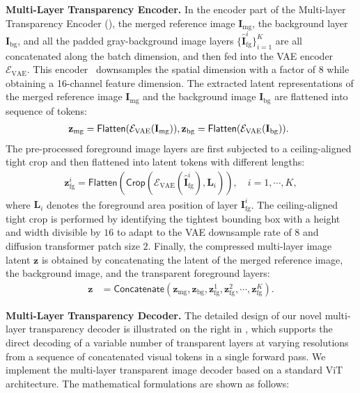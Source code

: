 \vspace{1mm}
\noindent\textbf{Multi-Layer Transparency Encoder.}
In the encoder part of the Multi-layer Transparency Encoder (), the merged reference image $\mathbf{I}_{\text{mg}}$, the background layer $\mathbf{I}_{\text{bg}}$, and all the padded gray-background image layers $\{\hat{\mathbf{I}}_\text{fg}^{i}\}_{i=1}^{K}$ are all concatenated along the batch dimension, and then fed into the VAE encoder $\mathcal{E}_{\text{VAE}}$. This encoder~\cite{flux} downsamples the spatial dimension with a factor of 8 while obtaining a 16-channel feature dimension.
The extracted latent representations of the merged reference image $\mathbf{I}_{\text{mg}}$ and the background image $\mathbf{I}_{\text{bg}}$ are flattened into sequence of tokens:
\begin{align}
\hspace{-0.5em}
    \mathbf{z}_{\text{mg}}=\mathsf{Flatten}(\mathcal{E}_{\text{VAE}}(\mathbf{I}_\text{mg})),
    \mathbf{z}_{\text{bg}}=\mathsf{Flatten}(\mathcal{E}_{\text{VAE}}(\mathbf{I}_\text{bg})).
\end{align}
\noindent
The pre-processed foreground image layers are first subjected to a ceiling-aligned tight crop and then flattened into latent tokens with different lengths:
\begin{align}
	\mathbf{z}_{\text{fg}}^{i} = \mathsf{Flatten}(\mathsf{Crop}(\mathcal{E}_{\text{VAE}}(\hat{\mathbf{I}}_\text{fg}^{i}), \mathbf{L}_i)), \quad i=1,\cdots,K,
\end{align}
where $\mathbf{L}_i$ denotes the foreground area position of layer $\mathbf{I}_\text{fg}^{i}$. The ceiling-aligned tight crop is performed by identifying the tightest bounding box with a height and width divisible by $16$ to adapt to the VAE downsample rate of $8$ and diffusion transformer patch size $2$.
Finally, the compressed multi-layer image latent $\mathbf{z}$ is obtained by concatenating the latent of the merged reference image, the background image, and the transparent foreground layers:
\begin{align}
	\mathbf{z}   &= \mathsf{Concatenate}(\mathbf{z}_{\text{mg}}, \mathbf{z}_{\text{bg}}, \mathbf{z}_{\text{fg}}^{1}, \mathbf{z}_{\text{fg}}^{2}, \cdots, \mathbf{z}_{\text{fg}}^{K}).
\end{align}

\vspace{1mm}
\noindent\textbf{Multi-Layer Transparency Decoder.}
The detailed design of our novel multi-layer transparency decoder is illustrated on the right in , which supports the direct decoding of a variable number of transparent layers at varying resolutions from a sequence of concatenated visual tokens in a single forward pass.
We implement the multi-layer transparent image decoder based on a standard ViT architecture.
The mathematical formulations are shown as follows:

